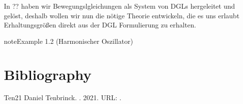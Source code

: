 \documentclass[letterpaper,10pt,english]{jupyterBook}
\begin{document}
In ?? haben wir Bewegungslgleichungen als System von DGLs hergeleitet und gelöst, deshalb wollen wir nun die nötige Theorie entwickeln, die es uns erlaubt Erhaltungsgrößen direkt aus der DGL Formulierung zu erhalten.
\label{ode/hamilton:example-0}
\begin{sphinxadmonition}{note}{Example 1.2 (Harmonischer Oszillator)}


\end{sphinxadmonition}


\chapter{Bibliography}
\label{\detokenize{references:bibliography}}\label{\detokenize{references::doc}}


\begin{sphinxthebibliography}{Ten21}
Daniel Tenbrinck. . 2021. URL: .
\end{sphinxthebibliography}
\end{document}
